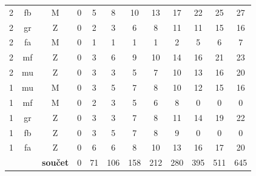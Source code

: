 \documentclass[thesis=M,czech]{FITthesis}[2013/05/10]
\begin{document}
\begin{table}[h]
\begin{tabular}{ccc | ccccccccc}
    2          & fb        & M       & 0 & 5 & 8 & 10 & 13 & 17 & 22 & 25 & 27  \\
    2          & gr        & Z       & 0 & 2 & 3 & 6  & 8  & 11 & 11 & 15 & 16  \\
    2          & fa        & M       & 0 & 1 & 1 & 1  & 1  & 2  & 5  & 6  & 7   \\
    2          & mf        & Z       & 0 & 3 & 6 & 9  & 10 & 14 & 16 & 21 & 23  \\
    2          & mu        & Z       & 0 & 3 & 3 & 5  & 7  & 10 & 13 & 16 & 20  \\
    1          & mu        & M       & 0 & 3 & 5 & 7  & 8  & 10 & 12 & 15 & 16  \\
    1          & mf        & M       & 0 & 2 & 3 & 5  & 6  & 8  & 0  & 0  & 0   \\
    1          & gr        & Z       & 0 & 3 & 3 & 7  & 8  & 11 & 14 & 19 & 22  \\
    1          & fb        & Z       & 0 & 3 & 5 & 7  & 8  & 9  & 0  & 0  & 0   \\
    1          & fa        & Z       & 0 & 6 & 6 & 8  & 10 & 13 & 16 & 17 & 20  \\ \hline
               &   & \textbf{součet} & 0 & 71 & 106 & 158 & 212 & 280 & 395 & 511 & 645  \\
    \end{tabular}
\end{table}
\end{document}
